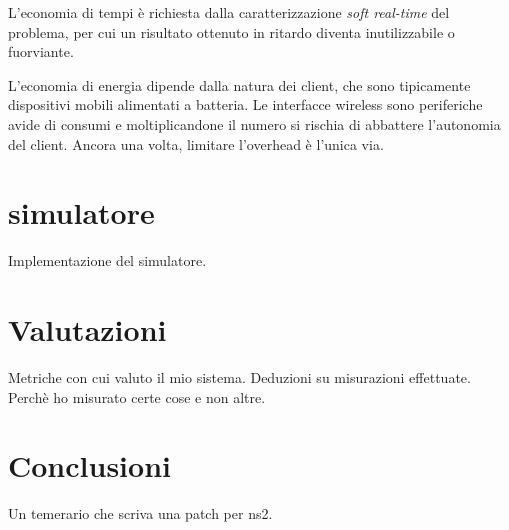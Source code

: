 \documentclass[12pt,a4paper,openright,twoside]{book}
\begin{document}
L'economia di tempi è richiesta dalla caratterizzazione \emph{soft
  real-time} del problema, per cui un risultato ottenuto in ritardo
diventa inutilizzabile o fuorviante.

L'economia di energia dipende dalla natura dei client, che sono
tipicamente dispositivi mobili alimentati a batteria. Le interfacce
wireless sono periferiche avide di consumi e moltiplicandone il numero
si rischia di abbattere l'autonomia del client. Ancora una volta,
limitare l'overhead è l'unica via.

\chapter{simulatore}
Implementazione del simulatore.

\chapter{Valutazioni}
Metriche con cui valuto il mio sistema. Deduzioni su misurazioni
effettuate. Perchè ho misurato certe cose e non altre.

\chapter*{Conclusioni}
Un temerario che scriva una patch per ns2.
\end{document}
